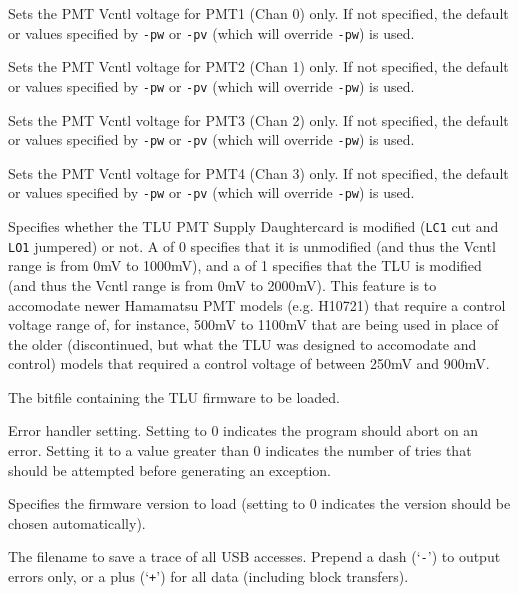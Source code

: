 \begin{description}
Sets the PMT Vcntl voltage for PMT1 (Chan 0) only. If not specified, the default or values specified
by \texttt{-pw} or \texttt{-pv} (which will override \texttt{-pw}) is used.

Sets the PMT Vcntl voltage for PMT2 (Chan 1) only. If not specified, the default or values specified
by \texttt{-pw} or \texttt{-pv} (which will override \texttt{-pw}) is used.

Sets the PMT Vcntl voltage for PMT3 (Chan 2) only. If not specified, the default or values specified
by \texttt{-pw} or \texttt{-pv} (which will override \texttt{-pw}) is used.

Sets the PMT Vcntl voltage for PMT4 (Chan 3) only. If not specified, the default or values specified
by \texttt{-pw} or \texttt{-pv} (which will override \texttt{-pw}) is used.

Specifies whether the TLU PMT Supply Daughtercard is modified (\texttt{LC1} cut and \texttt{LO1}
jumpered) or not.  A  of 0 specifies that it is unmodified (and thus the Vcntl range is
from 0mV to 1000mV), and a  of 1 specifies that the \gls{TLU} is modified (and thus the
Vcntl range is from 0mV to 2000mV).  This feature is to accomodate newer Hamamatsu PMT models
(e.g. H10721) that require a control voltage range of, for instance, 500mV to 1100mV that are being
used in place of the older (discontinued, but what the \gls{TLU} was designed to accomodate and
control) models that required a control voltage of between 250mV and 900mV.

The bitfile containing the TLU firmware to be loaded.

Error handler setting. Setting to 0 indicates the program should abort on an error. Setting it to a
value greater than 0 indicates the number of tries that should be attempted before generating an
exception.

Specifies the firmware version to load (setting to 0 indicates the version should be chosen automatically).

The filename to save a trace of all USB accesses. Prepend a dash (`\texttt{-}') to output errors
only, or a plus (`\texttt{+}') for all data (including block transfers).
\end{description}

